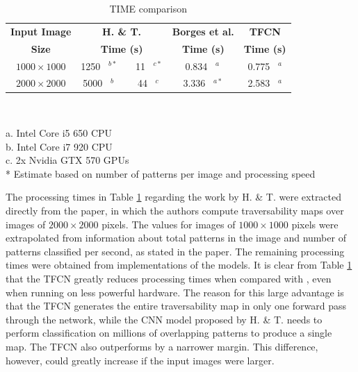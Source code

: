 \documentclass[conference]{IEEEtran}
\begin{document}
\begin{table}[htbp]
	\begin{center}
		\caption{TIME comparison}
		\begin{tabular}{|c|c c c|}
			\hline
			\textbf{Input Image} & \textbf{H. \& T. \cite{hudjakov:2013}} & \textbf{Borges et al.\cite{borges:2019}} & \textbf{TFCN} \\
			\textbf{Size} & \textbf{Time (s)} & \textbf{Time (s)} & \textbf{Time (s)} \\
			\hline
			$1000 \times 1000$ & 1250 \ $^{b*}$  \ \ \ 11 \ $^{c*}$ & 0.834 \ $^{a\ }$ & \cellcolor{blue!15} 0.775 \ $^{a}$ \\ %
			$2000 \times 2000$ & 5000 \ $^{b\phantom{*}}$  \ \ \ 44 \ $^{c\ }$ & 3.336 \ $^{a*}$ & \cellcolor{blue!15} 2.583 \ $^{a}$ \\ \hline
		\end{tabular} \\[0.01cm]
		\label{tab:comparison-time}
	\end{center}
	\hspace{0.2cm}
	\begin{minipage}[t]{\textwidth}
		\scriptsize{a. Intel Core i5 650 CPU} \\
		\scriptsize{b. Intel Core i7 920 CPU} \\
		\scriptsize{c. 2x Nvidia GTX 570 GPUs} \\
		\scriptsize{* Estimate based on number of patterns per image and processing speed}
	\end{minipage}
\vspace{-0.56cm}
\end{table}

The processing times in Table \ref{tab:comparison-time} regarding the work by H. \& T. were extracted directly from the paper, in which the authors compute traversability maps over images of $2000 \times 2000$ pixels.
The values for images of $1000 \times 1000$ pixels were extrapolated from information about total patterns in the image and number of patterns classified per second, as stated in the paper.
The remaining processing times were obtained from implementations of the models.
It is clear from Table \ref{tab:comparison-time} that the TFCN greatly reduces processing times when compared with \cite{hudjakov:2013}, even when running on less powerful hardware.
The reason for this large advantage is that the TFCN generates the entire traversability map in only one forward pass through the network, while the CNN model proposed by H. \& T. needs to perform classification on millions of overlapping patterns to produce a single map.
The TFCN also outperforms \cite{borges:2019} by a narrower margin.
This difference, however, could greatly increase if the input images were larger.
\end{document}
